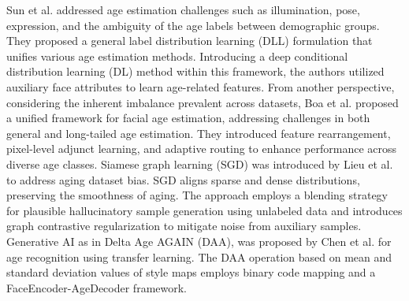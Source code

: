 Sun et al. \cite{9541205} addressed age estimation challenges such as
illumination, pose, expression, and the ambiguity of the age labels between
demographic groups. They proposed a general label distribution learning (DLL)
formulation that unifies various age estimation methods. Introducing a deep
conditional distribution learning (DL) method within this framework, the
authors utilized auxiliary face attributes to learn age-related features. From
another perspective, considering the inherent imbalance prevalent across
datasets, Boa et al. \cite{bao2023general} proposed a unified framework for
facial age estimation, addressing challenges in both general and long-tailed
age estimation. They introduced feature rearrangement, pixel-level adjunct
learning, and adaptive routing to enhance performance across diverse age
classes. Siamese graph learning (SGD) was introduced by Lieu et al.
\cite{10068268} to address aging dataset bias. SGD aligns sparse and dense
distributions, preserving the smoothness of aging. The approach employs a
blending strategy for plausible hallucinatory sample generation using
unlabeled data and introduces graph contrastive regularization to mitigate
noise from auxiliary samples. Generative AI as in Delta Age AGAIN (DAA), was
proposed by Chen et al. \cite{chen2023daa} for age recognition using transfer
learning. The DAA operation based on mean and standard deviation values of
style maps employs binary code mapping and a FaceEncoder-AgeDecoder framework.

